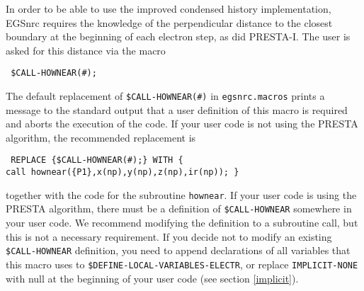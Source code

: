 In order to be able to use the improved
condensed history implementation, EGSnrc
requires the knowledge of the perpendicular distance
to the closest boundary at the beginning of each electron
step, as did PRESTA-I. The user is asked for this distance via the macro
\begin{flushleft}{\tt
\$CALL-HOWNEAR(\#); }
\end{flushleft}
The default replacement of {\tt \$CALL-HOWNEAR(\#)} in
{\tt egsnrc.macros} prints a message to the standard output
that a user definition of this macro is required and aborts
the execution of the code. If your user code is not using
the PRESTA algorithm, the recommended
replacement is
\begin{flushleft}{\tt
REPLACE \{\$CALL-HOWNEAR(\#);\} WITH \{ \\
\quad call hownear(\{P1\},x(np),y(np),z(np),ir(np)); \} }
\end{flushleft}
together with the code for the subroutine {\tt hownear}.
If your user code is using the PRESTA algorithm, there must
be a definition of {\tt \$CALL-HOWNEAR} somewhere in
your user code. We recommend modifying the definition
to a subroutine call, but this is not a necessary
requirement. If you decide not to modify an existing
{\tt \$CALL-HOWNEAR} definition, you need to append
declarations of all variables that this macro uses
to {\tt \$DEFINE-LOCAL-VARIABLES-ELECTR}, or replace
{\tt IMPLICIT-NONE} with null at the beginning of
your user code (see section \ref{implicit}).

